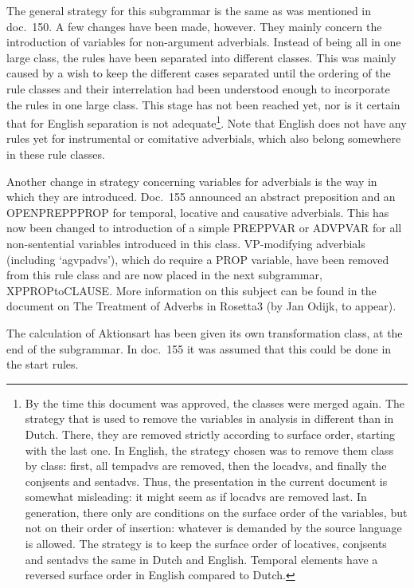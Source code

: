 The general strategy for this subgrammar is the same as was mentioned in doc.\ 
150. A few changes have been made, however. They mainly concern the 
introduction of variables for non-argument adverbials. Instead of being all in 
one large class, the rules have been separated into different classes. This was 
mainly caused by a wish to keep the different cases separated until the 
ordering of the rule classes and their interrelation had 
been understood enough to incorporate the rules in one large class.
This stage has not been reached yet, nor is it certain that for English 
separation is not adequate\footnote{By the time this document was approved, the 
classes were merged again. The strategy that is used to remove the variables 
in analysis in different than in Dutch. There, they are removed strictly
according to surface order, starting with the last one. In English, the strategy 
chosen was to remove them class by class: first, all tempadvs are removed, then 
the locadvs, and finally the conjsents and sentadvs. Thus, the presentation in 
the current document is somewhat misleading: it might seem as if locadvs are removed 
last. In generation, there only are conditions on the surface order of the 
variables, but not on their order of insertion: whatever is demanded by the 
source language is allowed. The strategy is to keep the surface order of 
locatives, conjsents and sentadvs the same in Dutch and English. Temporal 
elements have a reversed surface order in English compared to Dutch.}. 
Note that English does not 
have any rules yet for instrumental or comitative adverbials, which also 
belong somewhere in these rule classes.

Another change in strategy concerning variables for adverbials is the way in 
which they are introduced. Doc.\ 155 announced an abstract preposition and an 
OPENPREPPPROP for temporal, locative and causative adverbials. This has now 
been changed to introduction of a simple PREPPVAR or ADVPVAR for all 
non-sentential variables introduced in this class. 
VP-modifying adverbials (including `agvpadvs'), which do require a PROP 
variable, have been removed from this rule class and are now placed in the next 
subgrammar, XPPROPtoCLAUSE.
More information on this 
subject can be found in the document on The Treatment of Adverbs in Rosetta3 
(by Jan Odijk, to appear).

The calculation of Aktionsart has been given its own transformation class, at 
the end of the subgrammar. In doc.\ 155 it was assumed that this could be done 
in the start rules.

